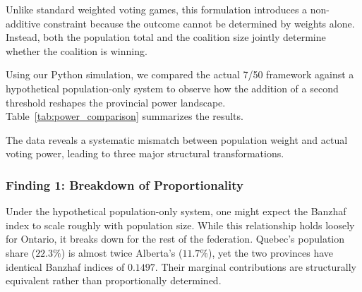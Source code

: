 \documentclass[lettersize,journal]{IEEEtran}
\begin{document}
Unlike standard weighted voting games, this formulation introduces a non-additive constraint because the outcome cannot be determined by weights alone. Instead, both the population total and the coalition size jointly determine whether the coalition is winning.

Using our Python simulation, we compared the actual 7/50 framework against a hypothetical population-only system to observe how the addition of a second threshold reshapes the provincial power landscape. Table~\ref{tab:power_comparison} summarizes the results.

\begin{table}[!t]
\caption{Comparison of Population, Population-Only Power, and 7/50 Power}
\label{tab:power_comparison}
\centering
\scriptsize
{}
\end{table}

The data reveals a systematic mismatch between population weight and actual voting power, leading to three major structural transformations.

\subsubsection*{Finding 1: Breakdown of Proportionality}
Under the hypothetical population-only system, one might expect the Banzhaf index to scale roughly with population size. While this relationship holds loosely for Ontario, it breaks down for the rest of the federation. Quebec's population share ($22.3\%$) is almost twice Alberta's ($11.7\%$), yet the two provinces have identical Banzhaf indices of $0.1497$. Their marginal contributions are structurally equivalent rather than proportionally determined.
\end{document}
